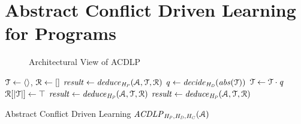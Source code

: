 \section{Abstract Conflict Driven Learning for Programs}

\begin{figure}[htbp]
\centering
{}
\caption{Architectural View of ACDLP\label{acdlp-top}}
\end{figure}

\begin{algorithm2e}[t]
\DontPrintSemicolon
{}
\begin{small}
$\mathcal{T} \leftarrow \langle\rangle$, $\mathcal{R} \leftarrow []$ \;
$\mathit{result} \leftarrow \mathit{deduce}_{\mathit{H_P}}(\mathcal{A},\mathcal{T},\mathcal{R})$ \;
 {
  \return \safe}
{
 {
  \return \unsafe}
  $\mathit{q} \leftarrow \mathit{decide}_{\mathit{H_D}}(\mathit{abs}(\mathcal{T}))$ \;
  $\mathcal{T} \leftarrow \mathcal{T} \cdot \mathit{q}$ \; 
  $\mathcal{R}[|\mathcal{T}|] \leftarrow \top$ \;
  $\mathit{result} \leftarrow \mathit{deduce}_{\mathit{H_P}}(\mathcal{A},\mathcal{T},\mathcal{R})$\;
   {
    \lIf{$\neg \analyzeconflict_{\confheur}(\abstransset,\trail,\reasons)$} {
      \return \safe
    }
    $\mathit{result} \leftarrow \mathit{deduce}_{\mathit{H_P}}(\mathcal{A},\mathcal{T},\mathcal{R})$ \;
  }
}
\end{small}
\caption{Abstract Conflict Driven Learning $\mathit{ACDLP}_{\mathit{H_P},\mathit{H_D},\mathit{H_C}}(\mathcal{A})$\label{Alg:acdcl}}
\end{algorithm2e}

